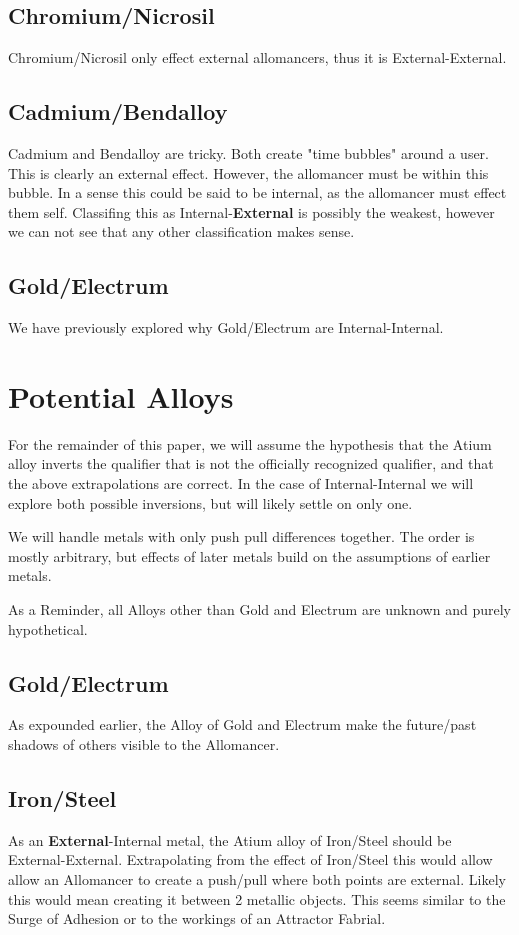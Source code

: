 \documentclass[conference]{IEEEtran}
\begin{document}
\subsection*{Chromium/Nicrosil}
Chromium/Nicrosil only effect external allomancers, thus it is External-External.
\subsection*{Cadmium/Bendalloy}
Cadmium and Bendalloy are tricky.  Both create "time bubbles" around a user.  This is clearly an external effect.  However, the allomancer must be within this bubble.  In a sense this could be said to be internal, as the allomancer must effect them self.  Classifing this as Internal-\textbf{External} is possibly the weakest, however we can not see that any other classification makes sense.
\subsection*{Gold/Electrum}
We have previously explored why Gold/Electrum are Internal-Internal.
%

\section*{Potential Alloys}
For the remainder of this paper, we will assume the hypothesis that the Atium alloy inverts the qualifier that is not the officially recognized qualifier, and that the above extrapolations are correct.  In the case of Internal-Internal we will explore both possible inversions, but will likely settle on only one.

We will handle metals with only push pull differences together.
The order is mostly arbitrary, but effects of later metals build on the assumptions of earlier metals.

As a Reminder, all Alloys other than Gold and Electrum are unknown and purely hypothetical.
\subsection*{Gold/Electrum}
As expounded earlier, the Alloy of Gold and Electrum make the future/past shadows of others visible to the Allomancer.

\subsection*{Iron/Steel}
As an \textbf{External}-Internal metal, the Atium alloy of Iron/Steel should be External-External.  Extrapolating from the effect of Iron/Steel this would allow allow an Allomancer to create a push/pull where both points are external.  Likely this would mean creating it between 2 metallic objects.  This seems similar to the Surge of Adhesion or to the workings of an Attractor Fabrial.
\end{document}
